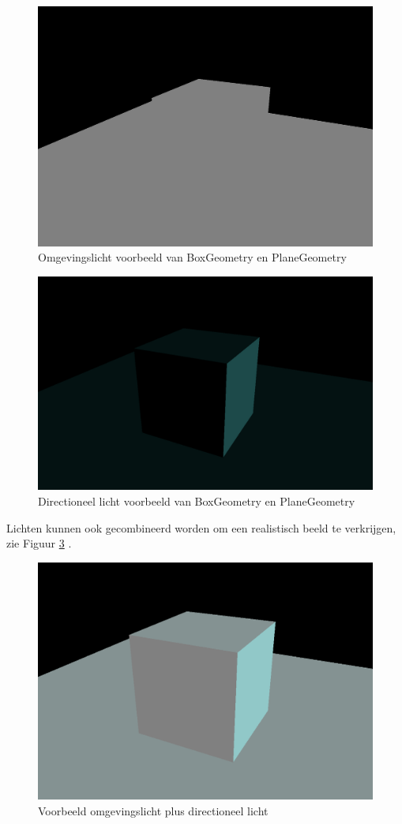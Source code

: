 \begin{figure}[h]
	\centering
	\includegraphics[width=.7\linewidth]{graphics/ambientLight}
	\caption[Omgevingslicht voorbeeld van BoxGeometry en PlaneGeometry]{Omgevingslicht voorbeeld van BoxGeometry en PlaneGeometry}
	\label{fig:ambientLight}
\end{figure}

\begin{figure}[h]
	\centering
	\includegraphics[width=.7\linewidth]{graphics/directionalLight}
	\caption[Directioneel licht voorbeeld van BoxGeometry en PlaneGeometry]{Directioneel licht voorbeeld van BoxGeometry en PlaneGeometry}
	\label{fig:directionalLight}
\end{figure}
\newpage
Lichten kunnen ook gecombineerd worden om een realistisch beeld te verkrijgen, zie Figuur  \ref{fig:ambientPlusDirectionalLight}  \autocite{Simon2023}.

\begin{figure}[h]
	\centering
	\includegraphics[width=.7\linewidth]{graphics/ambientPlusDirectionalLight}
	\caption[Voorbeeld omgevingslicht plus directioneel licht]{Voorbeeld omgevingslicht plus directioneel licht}
	\label{fig:ambientPlusDirectionalLight}
\end{figure}

